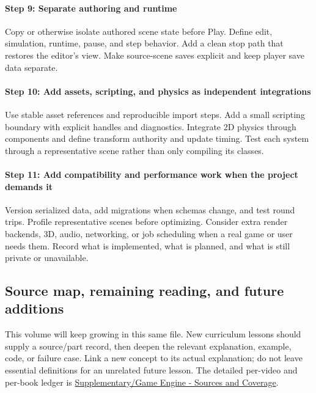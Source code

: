 \paragraph{Step 9: Separate authoring and runtime}\label{step-9-separate-authoring-and-runtime}

Copy or otherwise isolate authored scene state before Play. Define edit, simulation, runtime, pause, and step behavior. Add a clean stop path that restores the editor's view. Make source-scene saves explicit and keep player save data separate.

\paragraph{Step 10: Add assets, scripting, and physics as independent integrations}\label{step-10-add-assets-scripting-and-physics-as-independent-integrations}

Use stable asset references and reproducible import steps. Add a small scripting boundary with explicit handles and diagnostics. Integrate 2D physics through components and define transform authority and update timing. Test each system through a representative scene rather than only compiling its classes.

\paragraph{Step 11: Add compatibility and performance work when the project demands it}\label{step-11-add-compatibility-and-performance-work-when-the-project-demands-it}

Version serialized data, add migrations when schemas change, and test round trips. Profile representative scenes before optimizing. Consider extra render backends, 3D, audio, networking, or job scheduling when a real game or user needs them. Record what is implemented, what is planned, and what is still private or unavailable.

\subsection{Source map, remaining reading, and future additions}\label{source-map-remaining-reading-and-future-additions}

This volume will keep growing in this same file. New curriculum lessons should supply a source/part record, then deepen the relevant explanation, example, code, or failure case. Link a new concept to its actual explanation; do not leave essential definitions for an unrelated future lesson. The detailed per-video and per-book ledger is \hyperref[appendix-877738f6f4d2]{Supplementary/Game Engine - Sources and Coverage}.

